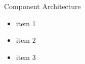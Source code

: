 \begin{frame}{Component Architecture}
	\begin{itemize}
		\item item 1
		\item item 2
		\item item 3
	\end{itemize}
\end{frame}
